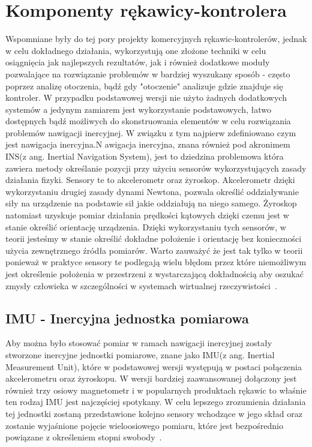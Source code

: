 \chapter{Komponenty rękawicy-kontrolera}
\label{ch:komponenty}
Wspomniane były do tej pory projekty komercyjnych rękawic-kontrolerów, jednak w celu dokładnego działania, wykorzystują one złożone techniki w celu osiągnięcia jak najlepszych rezultatów, jak i również dodatkowe moduły pozwalające na rozwiązanie problemów w bardziej wyszukany sposób - często poprzez analizę otoczenia, bądź gdy "otoczenie" analizuje gdzie znajduje się kontroler. W przypadku podstawowej wersji nie użyto żadnych dodatkowych systemów a jedynym zamiarem jest wykorzystanie podstawowych, łatwo dostępnych bądź możliwych do skonstruowania elementów w celu rozwiązania problemów nawigacji inercyjnej. W związku z tym najpierw zdefiniowano czym jest nawigacja inercyjna.N awigacja inercyjna, znana również pod akronimem INS(z ang. Inertial Navigation System), jest to dziedzina problemowa która zawiera metody określanie pozycji przy użyciu sensorów wykorzystujących zasady działania fizyki. Sensory te to akcelerometr oraz żyroskop. Akcelerometr dzięki wykorzystaniu drugiej zasady dynami Newtona, pozwala określić oddziaływanie siły na urządzenie na podstawie sił jakie oddziałują na niego samego. Żyroskop natomiast uzyskuje pomiar działania prędkości kątowych dzięki czemu jest w stanie określić orientację urządzenia. Dzięki wykorzystaniu tych sensorów, w teorii jesteśmy w stanie określić dokładne położenie i orientację bez konieczności użycia zewnętrznego źródła pomiarów. Warto zauważyć że jest tak tylko w teorii ponieważ w praktyce sensory te podlegają wielu błędom przez które niemożliwym jest określenie położenia w przestrzeni z wystarczającą dokładnością aby oszukać zmysły człowieka w szczególności w systemach wirtualnej rzeczywistości~\cite{podstawy}.
		
	\section{IMU - Inercyjna jednostka pomiarowa}
	\label{sec:imu}
	Aby można było stosować pomiar w ramach nawigacji inercyjnej zostały stworzone inercyjne jednostki pomiarowe, znane jako IMU(z ang. Inertial Measurement Unit), które w podstawowej wersji występują w postaci połączenia akcelerometru oraz żyroskopu. W wersji bardziej zaawansowanej dołączony jest również trzy osiowy magnetometr i w popularnych produktach rękawic to właśnie ten rodzaj IMU jest najczęściej spotykany. W celu lepszego zrozumienia działania tej jednostki zostaną przedstawione kolejno sensory wchodzące w jego skład oraz zostanie wyjaśnione pojęcie wieloosiowego pomiaru, które jest bezpośrednio powiązane z określeniem stopni swobody~\cite{bSensory}.
